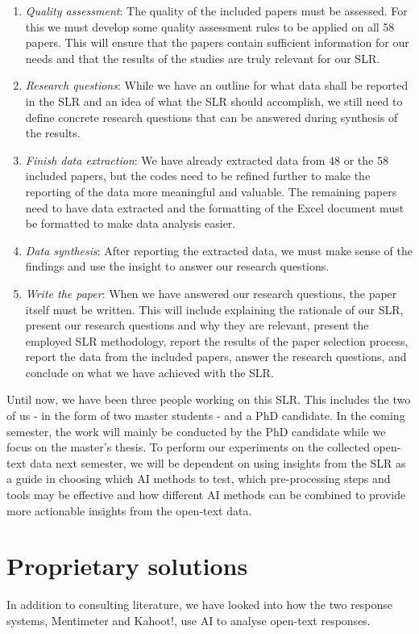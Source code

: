 \begin{enumerate}
    \item \textit{Quality assessment}: The quality of the included papers must be assessed. For this we must develop some quality assessment rules to be applied on all 58 papers. This will ensure that the papers contain sufficient information for our needs and that the results of the studies are truly relevant for our SLR.
    \item \textit{Research questions}: While we have an outline for what data shall be reported in the SLR and an idea of what the SLR should accomplish, we still need to define concrete research questions that can be answered during synthesis of the results.
    \item \textit{Finish data extraction}: We have already extracted data from 48 or the 
    58 included papers, but the codes need to be refined further to make the reporting of the data more meaningful and valuable. The remaining papers need to have data extracted and the formatting of the Excel document must be formatted to make data analysis easier.
    \item \textit{Data synthesis}: After reporting the extracted data, we must make sense of the findings and use the insight to answer our research questions.
    \item \textit{Write the paper}: When we have answered our research questions, the paper itself must be written. This will include explaining the rationale of our SLR, present our research questions and why they are relevant, present the employed SLR methodology, report the results of the paper selection process, report the data from the included papers, answer the research questions, and conclude on what we have achieved with the SLR.
\end{enumerate}

Until now, we have been three people working on this SLR. This includes the two of us - in the form of two master students - and a PhD candidate. In the coming semester, the work will mainly be conducted by the PhD candidate while we focus on the master's thesis. To perform our experiments on the collected open-text data next semester, we will be dependent on using insights from the SLR as a guide in choosing which AI methods to test, which pre-processing steps and tools may be effective and how different AI methods can be combined to provide more actionable insights from the open-text data.

\section{Proprietary solutions}
In addition to consulting literature, we have looked into how the two response systems, Mentimeter and Kahoot!, use AI to analyse open-text responses.

